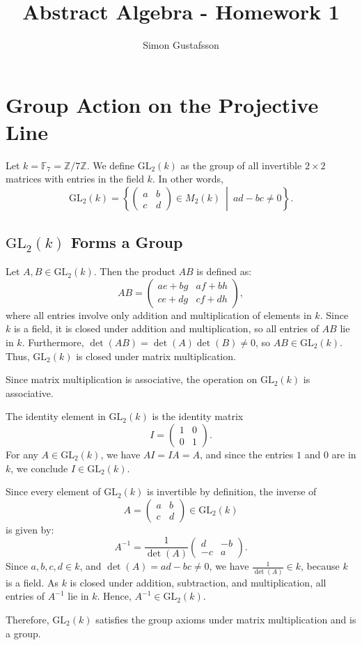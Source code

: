 \documentclass[12pt]{article}
\title{Abstract Algebra - Homework 1}
\author{Simon Gustafsson}
\date{}
\begin{document}
\maketitle
\section{Group Action on the Projective Line}

Let \( k = \mathbb{F}_7 = \mathbb{Z}/7\mathbb{Z} \). We define \( \mathrm{GL}_2(k) \) as the group of all invertible \( 2 \times 2 \) matrices with entries in the field \( k \). In other words,
\[
\mathrm{GL}_2(k) = \left\{ \begin{pmatrix} a & b \\ c & d \end{pmatrix} \in M_2(k) \ \middle| \ ad - bc \neq 0 \right\}.
\]

\subsection*{\(\mathrm{GL}_2(k)\) Forms a Group}

Let \( A, B \in \mathrm{GL}_2(k) \). Then the product \( AB \) is defined as:
\[
AB = \begin{pmatrix}
ae + bg & af + bh \\
ce + dg & cf + dh
\end{pmatrix},
\]
where all entries involve only addition and multiplication of elements in \( k \). Since \( k \) is a field, it is closed under addition and multiplication, so all entries of \( AB \) lie in \( k \). Furthermore, \( \det(AB) = \det(A)\det(B) \neq 0 \), so \( AB \in \mathrm{GL}_2(k) \). Thus, \( \mathrm{GL}_2(k) \) is closed under matrix multiplication.

Since matrix multiplication is associative, the operation on \( \mathrm{GL}_2(k) \) is associative.

The identity element in \( \mathrm{GL}_2(k) \) is the identity matrix
\[
I = \begin{pmatrix} 1 & 0 \\ 0 & 1 \end{pmatrix}.
\]
For any \( A \in \mathrm{GL}_2(k) \), we have \( AI = IA = A \), and since the entries \( 1 \) and \( 0 \) are in \( k \), we conclude \( I \in \mathrm{GL}_2(k) \).

Since every element of \( \mathrm{GL}_2(k) \) is invertible by definition, the inverse of
\[
A = \begin{pmatrix} a & b \\ c & d \end{pmatrix} \in \mathrm{GL}_2(k)
\]
is given by:
\[
A^{-1} = \frac{1}{\det(A)} \begin{pmatrix} d & -b \\ -c & a \end{pmatrix}.
\]
Since \( a, b, c, d \in k \), and \( \det(A) = ad - bc \neq 0 \), we have \( \frac{1}{\det(A)} \in k \), because \( k \) is a field. As \( k \) is closed under addition, subtraction, and multiplication, all entries of \( A^{-1} \) lie in \( k \). Hence, \( A^{-1} \in \mathrm{GL}_2(k) \).

Therefore, \( \mathrm{GL}_2(k) \) satisfies the group axioms under matrix multiplication and is a group.
\end{document}
